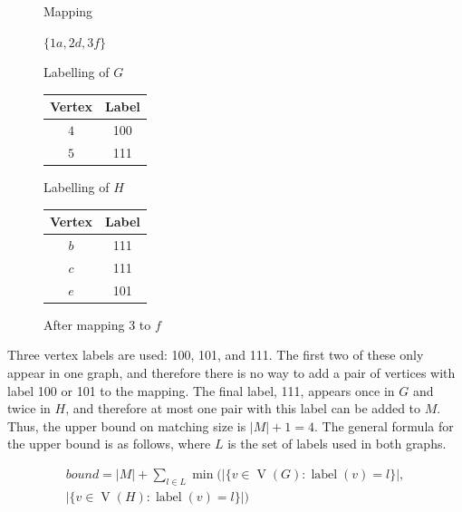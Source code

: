 \documentclass[letterpaper]{article}
\DeclareMathOperator{\V}{V}
\DeclareMathOperator{\vtxlabel}{label}
\begin{document}
\begin{figure}[ht]
\centering
\begin{minipage}[t]{0.2\linewidth}
    Mapping

    \bigskip

    $\{1a, 2d, 3f\}$
\end{minipage}
\quad
\begin{minipage}[t]{0.3\linewidth}
    Labelling of $G$
    \begin{tabular}[t]{cc}
    \hline
        Vertex & Label\\
    \hline
        $4$ & 100 \\
        $5$ & 111 \\
    \hline
    \end{tabular}
\end{minipage}
\quad
\begin{minipage}[t]{0.3\linewidth}
    Labelling of $H$
    \begin{tabular}[t]{cc}
    \hline
        Vertex & Label\\
    \hline
        $b$ & 111 \\
        $c$ & 111 \\
        $e$ & 101 \\
    \hline
    \end{tabular}
\end{minipage}
\caption{After mapping $3$ to $f$}
\label{fig:alg4}
\end{figure}

Three vertex labels are used: 100,
101, and 111.  The first two of these only appear in one graph, and therefore
there is no way to add a pair of vertices with label 100 or 101 to the mapping.
The final label, 111, appears once in $G$ and twice in $H$, and therefore at
most one pair with this label can be added to $M$.  Thus, the upper bound on
matching size is $|M| + 1 = 4$. The general formula for the upper bound is
as follows, where $L$ is the set of labels used in both graphs.

\begin{multline*}
    \mathit{bound} = |M| + \sum_{l \in L} \min\big(|\{ v \in \V(G) : \vtxlabel(v)=l\}|, \\
        |\{ v \in \V(H) : \vtxlabel(v)=l \}|\big)
\end{multline*}


\end{document}
